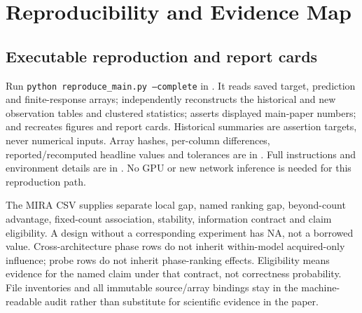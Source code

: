 \section{Reproducibility and Evidence Map}
\subsection{Executable reproduction and report cards}
Run \texttt{python reproduce\_main.py --complete} in . It reads saved target, prediction and finite-response arrays; independently reconstructs the historical and new observation tables and clustered statistics; asserts displayed main-paper numbers; and recreates figures and report cards. Historical summaries are assertion targets, never numerical inputs. Array hashes, per-column differences, reported/recomputed headline values and tolerances are in . Full instructions and environment details are in . No GPU or new network inference is needed for this reproduction path.

The MIRA CSV supplies separate local gap, named ranking gap, beyond-count advantage, fixed-count association, stability, information contract and claim eligibility. A design without a corresponding experiment has NA, not a borrowed value. Cross-architecture phase rows do not inherit within-model acquired-only influence; probe rows do not inherit phase-ranking effects. Eligibility means evidence for the named claim under that contract, not correctness probability. File inventories and all immutable source/array bindings stay in the machine-readable audit rather than substitute for scientific evidence in the paper.

